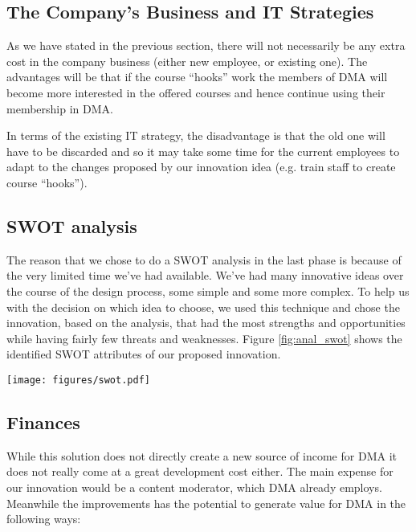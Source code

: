 \subsection{The Company’s Business and IT Strategies}
As we have stated in the previous section, there will not necessarily be any extra cost in the company business (either new employee, or existing one). The advantages will be that if the course “hooks” work the members of DMA will become more interested in the offered courses and hence continue using their membership in DMA.

In terms of the existing IT strategy, the disadvantage is that the old one will have to be discarded and so it may take some time for the current employees to adapt to the changes proposed by our innovation idea (e.g. train staff to create course “hooks”).


\subsection{SWOT analysis}
The reason that we chose to do a SWOT analysis in the last phase is because of the very limited time we’ve had available. We’ve had many innovative ideas over the course of the design process, some simple and some more complex. To help us with the decision on which idea to choose, we used this technique and chose the innovation, based on the analysis, that had the most strengths and opportunities while having fairly few threats and weaknesses. Figure \ref{fig:anal_swot} shows the identified SWOT attributes of our proposed innovation.

\begin{figure*}[h!]
 \begin{center}
  \texttt{[image: figures/swot.pdf]}
  \caption{Our baseline-plan for the project.\label{fig:anal_swot}}
 \end{center}
\end{figure*}

\subsection{Finances}
While this solution does not directly create a new source of income for DMA it does not really come at a great development cost either. The main expense for our innovation would be a content moderator, which DMA already employs. Meanwhile the improvements has the potential to generate value for DMA in the following ways:


